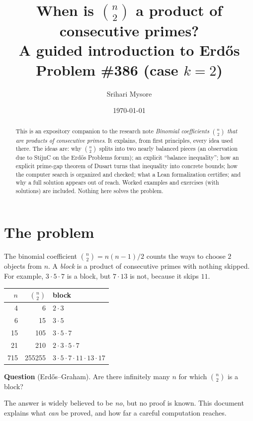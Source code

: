 \documentclass[11pt]{article}
\title{When is $\binom{n}{2}$ a product of consecutive primes?\\[4pt]
\large A guided introduction to Erd\H{o}s Problem \#386 (case $k=2$)}
\author{Srihari Mysore}
\date{\today}
\theoremstyle{definition}
\theoremstyle{remark}
\begin{document}
\maketitle

\begin{abstract}
This is an expository companion to the research note \emph{Binomial coefficients
$\binom{n}{2}$ that are products of consecutive primes}. It explains, from first principles,
every idea used there. The ideas are: why $\binom{n}{2}$ splits into two nearly balanced
pieces (an observation due to StijnC on the Erd\H{o}s Problems forum); an explicit
``balance inequality''; how an explicit prime-gap theorem of Dusart turns that inequality
into concrete bounds; how the computer search is organized and checked; what a Lean
formalization certifies; and why a full solution appears out of reach. Worked examples and
exercises (with solutions) are included. Nothing here solves the problem.
\end{abstract}

\tableofcontents

\section{The problem}

The binomial coefficient $\binom{n}{2} = n(n-1)/2$ counts the ways to choose $2$ objects from
$n$. A \emph{block} is a product of consecutive primes with nothing skipped. For example,
$3\cdot5\cdot7$ is a block, but $7\cdot 13$ is not, because it skips $11$.

\begin{center}
\begin{tabular}{rrl}
\toprule
$n$ & $\binom{n}{2}$ & block \\
\midrule
4 & 6 & $2\cdot 3$ \\
6 & 15 & $3\cdot 5$ \\
15 & 105 & $3\cdot 5\cdot 7$ \\
21 & 210 & $2\cdot 3\cdot 5\cdot 7$ \\
715 & 255255 & $3\cdot 5\cdot 7\cdot 11\cdot 13\cdot 17$ \\
\bottomrule
\end{tabular}
\end{center}

\noindent\textbf{Question} (Erd\H{o}s--Graham). Are there infinitely many $n$ for which
$\binom{n}{2}$ is a block?

The answer is widely believed to be \emph{no}, but no proof is known. This document explains
what \emph{can} be proved, and how far a careful computation reaches.
\end{document}
